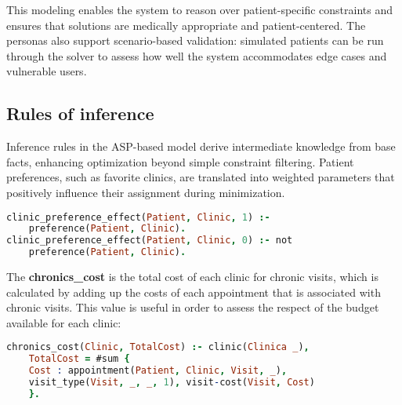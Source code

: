 \documentclass{tlp}
\begin{document}






This modeling enables the system to reason over patient-specific constraints and ensures that solutions are medically appropriate and patient-centered. The personas also support scenario-based validation: simulated patients can be run through the solver to assess how well the system accommodates edge cases and vulnerable users.

\vspace{-0.5cm}
\subsection{Rules of inference}
Inference rules in the ASP-based model derive intermediate knowledge from base facts, enhancing optimization beyond simple constraint filtering. Patient preferences, such as favorite clinics, are translated into weighted parameters that positively influence their assignment during minimization.
\begin{lstlisting}[language=Prolog, caption=Effect of Clinic Preference on Patient Assignment]
clinic_preference_effect(Patient, Clinic, 1) :-
    preference(Patient, Clinic).
clinic_preference_effect(Patient, Clinic, 0) :- not
    preference(Patient, Clinic).
\end{lstlisting}

The \textbf{chronics\_cost} is the total cost of each clinic for chronic visits, which is calculated by adding up the costs of each appointment that is associated with chronic visits. This value is useful in order to assess the respect of the budget available for
each clinic:
\begin{lstlisting}[language=Prolog, caption=Calculation of Total Cost for Chronic Patients]
chronics_cost(Clinic, TotalCost) :- clinic(Clinica _),
    TotalCost = #sum {
    Cost : appointment(Patient, Clinic, Visit, _),
    visit_type(Visit, _, _, 1), visit-cost(Visit, Cost)
    }.
\end{lstlisting}
\end{document}
